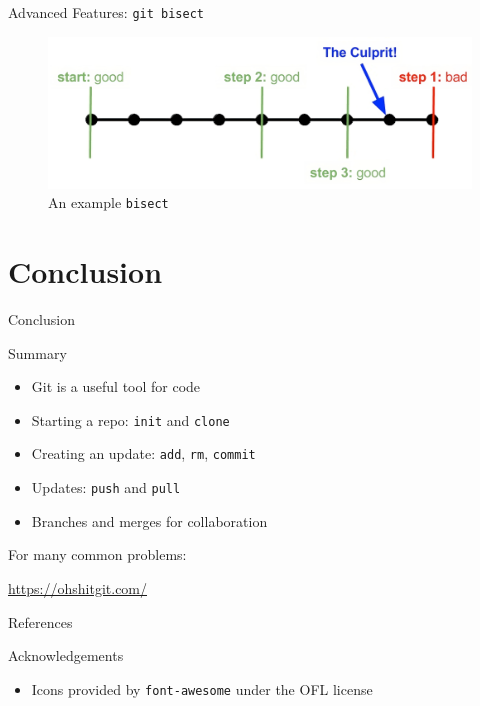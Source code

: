 \documentclass[compress,aspectratio=169]{beamer}
\begin{document}
  \begin{frame}{Advanced Features: \texttt{git bisect}}
    \begin{figure}
      \includegraphics[width=\textwidth]{./assets/bisect.png}
      \caption{An example \texttt{bisect} \cite{bisect}}
    \end{figure}
  \end{frame}



	\section{Conclusion}

	\begin{frame}{Conclusion}
    \begin{block}{Summary}
      \begin{itemize}
        \item Git is a useful tool for code
        \item Starting a repo: \texttt{init} and \texttt{clone}
        \item Creating an update: \texttt{add}, \texttt{rm}, \texttt{commit}
        \item Updates: \texttt{push} and \texttt{pull}
        \item Branches and merges for collaboration
      \end{itemize}
    \end{block}
    \begin{block}{For many common problems:}
      \begin{center}
        \LARGE
        \href{https://ohshitgit.com/}{\url{https://ohshitgit.com/}}
      \end{center}
    \end{block}
		\label{pg:lastpage} %
	\end{frame}

	\begin{frame}{References}
		\renewcommand*{\bibfont}{\normalfont\scriptsize}
		\printbibliography[heading=none]
	\end{frame}

  \begin{frame}{Acknowledgements}
    \begin{itemize}
      \item Icons provided by \texttt{font-awesome} under the OFL license
    \end{itemize}
  \end{frame}
\end{document}

